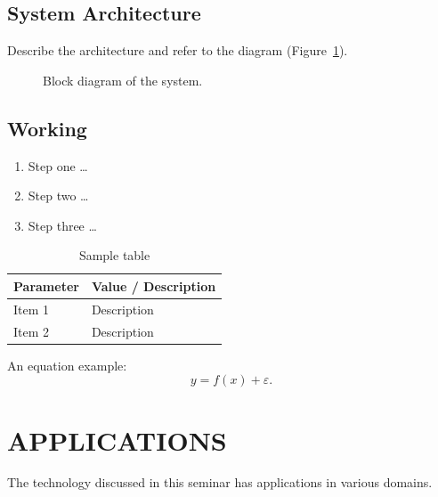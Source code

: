 \documentclass[12pt,a4paper]{report}
\begin{document}
\section{System Architecture}
Describe the architecture and refer to the diagram (Figure~\ref{fig:arch}).

\begin{figure}[htbp]
\centering
{}
\caption{Block diagram of the system.}\label{fig:arch}
\end{figure}

\section{Working}
\begin{enumerate}[leftmargin=*]
  \item Step one \ldots
  \item Step two \ldots
  \item Step three \ldots
\end{enumerate}

\begin{table}[htbp]
\centering\small\singlespacing
\caption{Sample table}\label{tab:one}
\begin{tabular}{|p{4cm}|p{8cm}|}
\hline
\textbf{Parameter} & \textbf{Value / Description}\\\hline
Item 1 & Description\\\hline
Item 2 & Description\\\hline
\end{tabular}
\end{table}

An equation example:
\begin{equation}
y = f(x) + \varepsilon .
\end{equation}

\chapter{APPLICATIONS}
The technology discussed in this seminar has applications in various domains.
\end{document}
